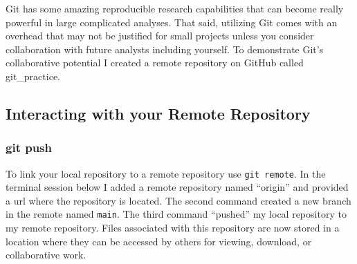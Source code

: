 \documentclass[
  letterpaper,
  DIV=11,
  numbers=noendperiod]{scrreprt}
\newenvironment{Shaded}{\begin{snugshade}}{\end{snugshade}}
\newcommand{\NormalTok}[1]{\textcolor[rgb]{0.00,0.23,0.31}{#1}}
\begin{document}
Git has some amazing reproducible research capabilities that can become
really powerful in large complicated analyses. That said, utilizing Git
comes with an overhead that may not be justified for small projects
unless you consider collaboration with future analysts including
yourself. To demonstrate Git's collaborative potential I created a
remote repository on GitHub called git\_practice.

\hypertarget{interacting-with-your-remote-repository}{%
\subsection{Interacting with your Remote
Repository}\label{interacting-with-your-remote-repository}}

\hypertarget{git-push}{%
\subsubsection{git push}\label{git-push}}

To link your local repository to a remote repository use
\texttt{git\ remote}. In the terminal session below I added a remote
repository named ``origin'' and provided a url where the repository is
located. The second command created a new branch in the remote named
\texttt{main}. The third command ``pushed'' my local repository to my
remote repository. Files associated with this repository are now stored
in a location where they can be accessed by others for viewing,
download, or collaborative work.

\begin{Shaded}
\end{Shaded}
\end{document}
